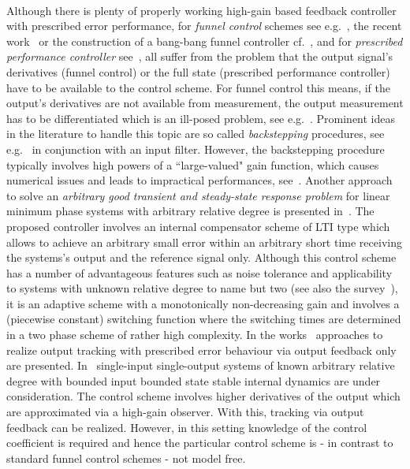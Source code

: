 \documentclass[ envcountsect, envcountsame]{svjour3}
\begin{document}
\ \\ 
Although there is plenty of properly working high-gain based feedback controller with prescribed error performance, for \textit{funnel control} schemes see e.g.~\cite{IlchRyan02b,BergLe18a},
the recent work~\cite{BergIlch21} or the construction of a bang-bang funnel controller cf.~\cite{LibeTren13b}, and for \textit{prescribed performance controller} see~\cite{BechRovi09,BechRovi14},
 all suffer from the problem that the output signal's derivatives (funnel control) or the full state (prescribed performance controller) have to be available to the control scheme. 
For funnel control this means, if the output's derivatives are not available from measurement, the output measurement has to be differentiated which is an ill-posed problem, see e.g.~\cite[Sec. 1.4.4]{Hack12}.
Prominent ideas in the literature to handle this topic are so called \textit{backstepping} procedures, see e.g.~\cite{IlchRyan06b,IlchRyan07} in conjunction with an input filter. 
However, the backstepping procedure typically involves high powers of a ``large-valued" gain function, which causes numerical issues and leads to impractical performances, see~\cite[Sec. 4.4.3]{Hack12}.
%
%
Another approach to solve an \textit{arbitrary good transient and steady-state response problem} for linear minimum phase systems with arbitrary relative degree is presented in~\cite{MillDavi91}.
The proposed controller involves an internal compensator scheme of LTI type which allows to achieve an arbitrary small error within an arbitrary short time  receiving the systems's output and the reference signal only. 
Although this control scheme has a number of advantageous features such as noise tolerance and applicability to systems with unknown relative degree to name but two (see also the survey~\cite{Ilch91}), it is an adaptive scheme with a monotonically non-decreasing gain and involves a (piecewise constant) switching function where the switching times are determined in a two phase scheme of rather high complexity.
%
%
In the works~\cite{ChowKhal19,DimaBech20} approaches to realize output tracking with prescribed error behaviour via output feedback only are presented.
In~\cite{ChowKhal19} single-input single-output systems of known arbitrary relative degree with bounded input bounded state stable internal dynamics are under consideration. 
The control scheme involves higher derivatives of the output which are approximated via a high-gain observer.
With this, tracking via output feedback can be realized. However, in this setting knowledge of the control coefficient is required and hence the particular control scheme is - in contrast to standard funnel control schemes - not model free. 
\end{document}
